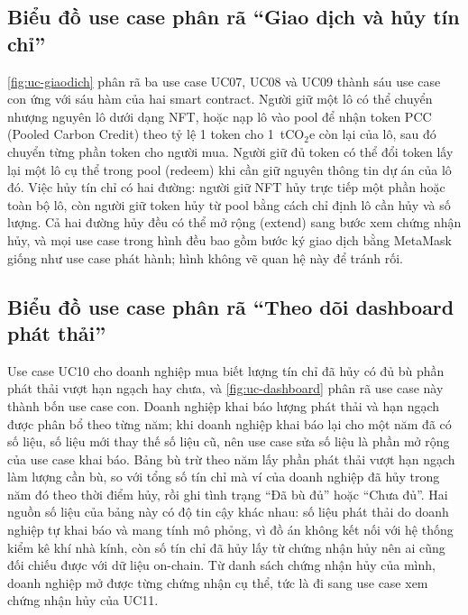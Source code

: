 \HinhUCPhatHanh

\subsection*{Biểu đồ use case phân rã ``Giao dịch và hủy tín chỉ''}
\label{subsec:uc-giaodich}

\autoref{fig:uc-giaodich} phân rã ba use case UC07, UC08 và UC09 thành sáu use case con ứng với sáu hàm của hai smart contract. Người giữ một lô có thể chuyển nhượng nguyên lô dưới dạng NFT, hoặc nạp lô vào pool để nhận token PCC (Pooled Carbon Credit) theo tỷ lệ 1 token cho 1~tCO$_2$e còn lại của lô, sau đó chuyển từng phần token cho người mua. Người giữ đủ token có thể đổi token lấy lại một lô cụ thể trong pool (redeem) khi cần giữ nguyên thông tin dự án của lô đó. Việc hủy tín chỉ có hai đường: người giữ NFT hủy trực tiếp một phần hoặc toàn bộ lô, còn người giữ token hủy từ pool bằng cách chỉ định lô cần hủy và số lượng. Cả hai đường hủy đều có thể mở rộng (extend) sang bước xem chứng nhận hủy, và mọi use case trong hình đều bao gồm bước ký giao dịch bằng MetaMask giống như use case phát hành; hình không vẽ quan hệ này để tránh rối.

\HinhUCGiaoDich

\FloatBarrier
\subsection*{Biểu đồ use case phân rã ``Theo dõi dashboard phát thải''}
\label{subsec:uc-dashboard}

Use case UC10 cho doanh nghiệp mua biết lượng tín chỉ đã hủy có đủ bù phần phát thải vượt hạn ngạch hay chưa, và \autoref{fig:uc-dashboard} phân rã use case này thành bốn use case con. Doanh nghiệp khai báo lượng phát thải và hạn ngạch được phân bổ theo từng năm; khi doanh nghiệp khai báo lại cho một năm đã có số liệu, số liệu mới thay thế số liệu cũ, nên use case sửa số liệu là phần mở rộng của use case khai báo. Bảng bù trừ theo năm lấy phần phát thải vượt hạn ngạch làm lượng cần bù, so với tổng số tín chỉ mà ví của doanh nghiệp đã hủy trong năm đó theo thời điểm hủy, rồi ghi tình trạng ``Đã bù đủ'' hoặc ``Chưa đủ''. Hai nguồn số liệu của bảng này có độ tin cậy khác nhau: số liệu phát thải do doanh nghiệp tự khai báo và mang tính mô phỏng, vì đồ án không kết nối với hệ thống kiểm kê khí nhà kính, còn số tín chỉ đã hủy lấy từ chứng nhận hủy nên ai cũng đối chiếu được với dữ liệu on-chain. Từ danh sách chứng nhận hủy của mình, doanh nghiệp mở được từng chứng nhận cụ thể, tức là đi sang use case xem chứng nhận hủy của UC11.

